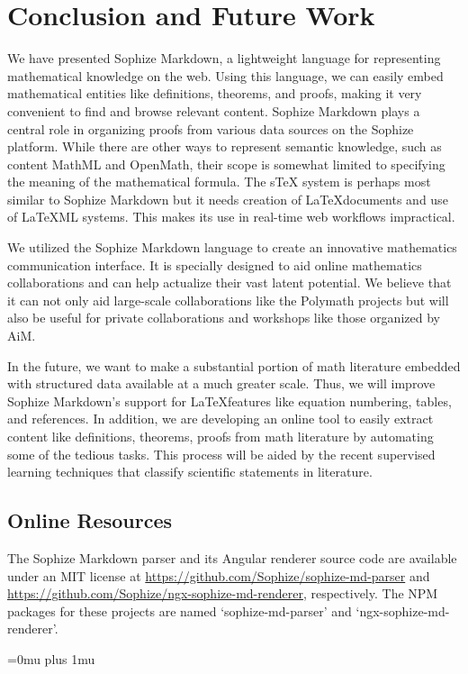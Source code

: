 \documentclass[]{ceurart}
\begin{document}
\section{Conclusion and Future Work}

We have presented Sophize Markdown, a lightweight language for representing mathematical knowledge on the web. Using this language, we can easily embed mathematical entities like definitions, theorems, and proofs, making it very convenient to find and browse relevant content. Sophize Markdown plays a central role in organizing proofs from various data sources on the Sophize platform. While there are other ways to represent semantic knowledge, such as content MathML and OpenMath, their scope is somewhat limited to specifying the meaning of the mathematical formula. The sTeX system \cite{Kohlhase2008} is perhaps most similar to Sophize Markdown but it needs creation of \LaTeX\space documents and use of \LaTeX ML systems. This makes its use in real-time web workflows impractical.

We utilized the Sophize Markdown language to create an innovative mathematics communication interface. It is specially designed to aid online mathematics collaborations and can help actualize their vast latent potential. We believe that it can not only aid large-scale collaborations like the Polymath projects but will also be useful for private collaborations and workshops like those organized by AiM.

In the future, we want to make a substantial portion of math literature embedded with structured data available at a much greater scale. Thus, we will improve Sophize Markdown's support for \LaTeX\space features like equation numbering, tables, and references. In addition, we are developing an online tool to easily extract content like definitions, theorems, proofs from math literature by automating some of the tedious tasks. This process will be aided by the recent supervised learning techniques \cite{ginev2019scientific} that classify scientific statements in literature.


\subsection*{Online Resources}
The Sophize Markdown parser and its Angular renderer source code are available under an MIT license at \url{https://github.com/Sophize/sophize-md-parser} and \url{https://github.com/Sophize/ngx-sophize-md-renderer}, respectively. The NPM packages for these projects are named `sophize-md-parser' and `ngx-sophize-md-renderer'.

\Urlmuskip=0mu plus 1mu\relax


\end{document}
